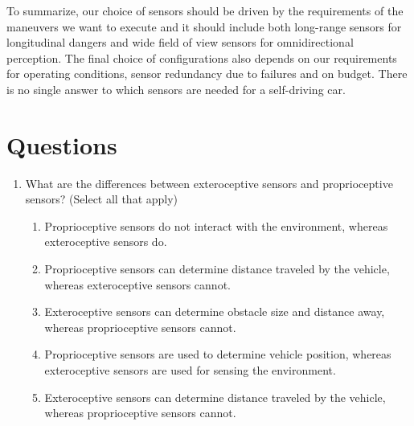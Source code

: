 To summarize, our choice of sensors should be driven by the requirements of the maneuvers we want to execute and it should include 
both long-range sensors for longitudinal dangers and wide field of view sensors for omnidirectional perception. 
The final choice of configurations also depends on our requirements for operating conditions, sensor redundancy due to failures and on budget. 
There is no single answer to which sensors are needed for a self-driving car. 

\section{Questions}
\label{questions_hardware_for_self_driving_cars}

\begin{enumerate}
\item What are the differences between exteroceptive sensors and proprioceptive sensors? (Select all that apply)
	\begin{enumerate}
		\item Proprioceptive sensors do not interact with the environment, whereas exteroceptive sensors do.
		\item Proprioceptive sensors can determine distance traveled by the vehicle, whereas exteroceptive sensors cannot.
		\item Exteroceptive sensors can determine obstacle size and distance away, whereas proprioceptive sensors cannot.
		\item Proprioceptive sensors are used to determine vehicle position, whereas exteroceptive sensors are used for sensing the environment.
		\item Exteroceptive sensors can determine distance traveled by the vehicle, whereas proprioceptive sensors cannot.
	\end{enumerate}
	

\end{enumerate}
